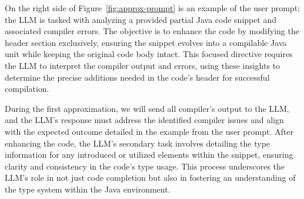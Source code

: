On the right side of Figure~\ref{fig:approx-prompt} is an example of the user prompt; the LLM is tasked with analyzing a provided partial Java code snippet and associated compiler errors. The objective is to enhance the code by modifying the header section exclusively, ensuring the snippet evolves into a compilable Java unit while keeping the original code body intact. This focused directive requires the LLM to interpret the compiler output and errors, using these insights to determine the precise additions needed in the code's header for successful compilation.

During the first approximation, we will send all compiler's output to the LLM, and the LLM's response must address the identified compiler issues and align with the expected outcome detailed in the example from the user prompt. After enhancing the code, the LLM's secondary task involves detailing the type information for any introduced or utilized elements within the snippet, ensuring clarity and consistency in the code's type usage. This process underscores the LLM's role in not just code completion but also in fostering an understanding of the type system within the Java environment.




